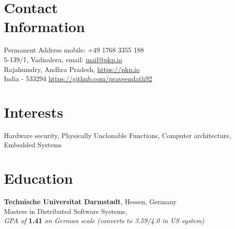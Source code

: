 \documentclass[margin,line]{resume}
\begin{document}


 \vspace{55mm}
\begin{resume}

\section{\mysidestyle Contact\\Information}

    {\sc Permanent Address}				\hfill {\sc mobile}: +49 1768 3355 188								\vspace{0mm}\\\vspace{0mm}%
    5-139/1, Vadisaleru,				\hfill {\sc email}: \url{mail@pkp.io}						\vspace{0mm}\\\vspace{0mm}%
    Rajahumdry, Andhra Pradesh,			\hfill {} \url{https://pkp.io}								\vspace{0mm}\\\vspace{0mm}%
    India - 533294				\hfill {}\url{https://github.com/praveendath92}
        
\section{\mysidestyle Interests}
Hardware security, Physically Unclonable Functions, Computer architecture, Embedded Systems
\vspace{-2mm}

\section{\mysidestyle Education}
		
		{\bf Technische Universitat Darmstadt}, Hessen, Germany\\
		Masters in Distributed Software Systems,\\
        \textit{\hspace*{2mm}GPA of} \textbf{1.41} \textit{on German scale (converts to 3.59/4.0 in US system)}
        \vspace{-2mm}
		

\end{resume}
\end{document}
